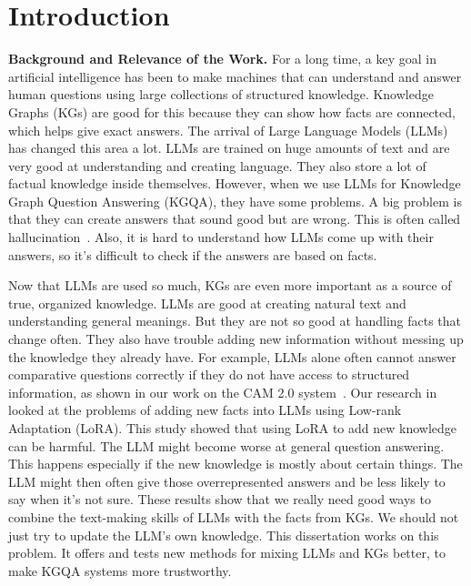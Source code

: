 \chapter*{Introduction}

\textbf{Background and Relevance of the Work.}
For a long time, a key goal in artificial intelligence has been to make machines that can understand and answer human questions using large collections of structured knowledge. Knowledge Graphs (KGs) are good for this because they can show how facts are connected, which helps give exact answers. The arrival of Large Language Models (LLMs) has changed this area a lot. LLMs are trained on huge amounts of text and are very good at understanding and creating language. They also store a lot of factual knowledge inside themselves. However, when we use LLMs for Knowledge Graph Question Answering (KGQA), they have some problems. A big problem is that they can create answers that sound good but are wrong. This is often called hallucination~\cite{lin-etal-2022-truthfulqa, DBLP:conf/emnlp/RobertsRS20, DBLP:journals/csur/JiLFYSXIBMF23, DBLP:journals/corr/abs-2401-01313}. Also, it is hard to understand how LLMs come up with their answers, so it's difficult to check if the answers are based on facts.


Now that LLMs are used so much, KGs are even more important as a source of true, organized knowledge. LLMs are good at creating natural text and understanding general meanings. But they are not so good at handling facts that change often. They also have trouble adding new information without messing up the knowledge they already have. For example, LLMs alone often cannot answer comparative questions correctly if they do not have access to structured information, as shown in our work on the CAM 2.0 system~\cite{DBLP:conf/coling/ShalloufHSVMPBN24}. Our research in~\cite{pletenev-etal-2025-much} looked at the problems of adding new facts into LLMs using Low-rank Adaptation (LoRA). This study showed that using LoRA to add new knowledge can be harmful. The LLM might become worse at general question answering. This happens especially if the new knowledge is mostly about certain things. The LLM might then often give those overrepresented answers and be less likely to say when it's not sure. These results show that we really need good ways to combine the text-making skills of LLMs with the facts from KGs. We should not just try to update the LLM's own knowledge. This dissertation works on this problem. It offers and tests new methods for mixing LLMs and KGs better, to make KGQA systems more trustworthy.

